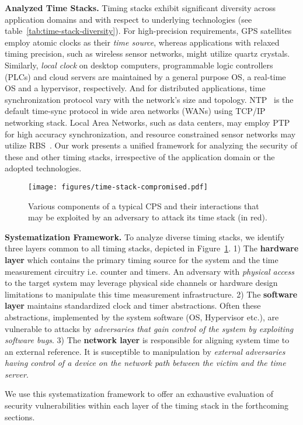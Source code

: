 \noindent\textbf{Analyzed Time Stacks.} Timing stacks exhibit significant diversity across application domains and with respect to underlying technologies (see table~\ref{tab:time-stack-diversity}). For high-precision requirements, GPS satellites employ atomic clocks as their \textit{time source}, whereas applications with relaxed timing precision, such as wireless sensor networks, might utilize quartz crystals. Similarly, \textit{local clock} on desktop computers, programmable logic controllers (PLCs) and cloud servers are maintained by a general purpose OS, a real-time OS and a hypervisor, respectively. And for distributed applications, time synchronization protocol vary with the network's size and topology. NTP~\cite{ntpv4-rfc} is the default time-sync protocol in wide area networks (WANs) using TCP/IP networking stack. Local Area Networks, such as data centers, may employ PTP~\cite{ptp-std-doc} for high accuracy synchronization, and resource constrained sensor networks may utilize RBS~\cite{Elson2003RBS}. Our work presents a unified framework for analyzing the security of these and other timing stacks, irrespective of the application domain or the adopted technologies.

\begin{figure}[tb]
    \small
    \centering
    \texttt{[image: figures/time-stack-compromised.pdf]}
    \caption{Various components of a typical CPS and their interactions that may be exploited by an adversary to attack its time stack (in red).}
    \label{fig:time-stack-attack-surface}
\end{figure}

\noindent\textbf{{Systematization Framework.}}
To analyze diverse timing stacks, we identify three layers common to all timing stacks, depicted in Figure~\ref{fig:time-stack-attack-surface}. 1) The \textbf{hardware layer} which contains the primary timing source for the system and the time measurement circuitry i.e. counter and timers. An adversary with \textit{physical access} to the target system may leverage physical side channels or hardware design limitations to manipulate this time measurement infrastructure. 2) The \textbf{software layer} maintains standardized clock and timer abstractions. Often these abstractions, implemented by the system software (OS, Hypervisor etc.), are vulnerable to attacks by \textit{adversaries that gain control of the system by exploiting software bugs}. 3) The \textbf{network layer} is responsible for aligning system time to an external reference. It is susceptible to manipulation by \textit{external adversaries having control of a device on the network path between the victim and the time server}.

We use this systematization framework to offer an exhaustive evaluation of security vulnerabilities within each layer of the timing stack in the forthcoming sections.